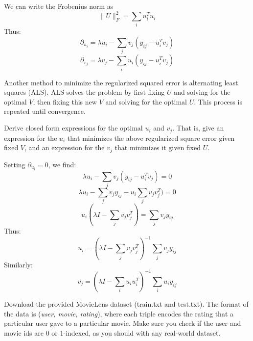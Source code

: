 \begin{solution}
 We can write the Frobenius norm as
 \begin{equation}
	 \|U\|_F^2 = \sum_i u_i^Tu_i
 \end{equation}
 Thus:
 \begin{equation}
	 \partial_{u_i} = \lambda u_i-\sum_j v_j(y_{ij}-u_i^Tv_j)
 \end{equation}
 \begin{equation}
	\partial_{v_j} = \lambda v_j-\sum_i u_i(y_{ij}-u_i^Tv_j)
\end{equation}
\end{solution}

\problem[5]
Another method to minimize the regularized squared error is alternating least squares (ALS). ALS solves the problem by first fixing $U$ and solving for the optimal $V$, then fixing this new $V$ and solving for the optimal $U$.  This process is repeated until convergence.

Derive closed form expressions for the optimal $u_i$ and $v_j$.  That is, give an expression for the $u_i$ that minimizes the above regularized square error given fixed $V$, and an expression for the $v_j$ that minimizes it given fixed $U$.

\begin{solution}
 Setting $\partial_{u_i} = 0$, we find:
 \begin{equation}
	\lambda u_i-\sum_j v_j(y_{ij}-u_i^Tv_j)=0
 \end{equation}
 \begin{equation}
	\lambda u_i-\sum_j v_jy_{ij}-u_i\sum_jv_jv_j^T)=0
 \end{equation}
 \begin{equation}
	u_i(\lambda I-\sum_jv_jv_j^T)=\sum_j v_jy_{ij}
 \end{equation}
 Thus:
 \begin{equation}
	u_i = (\lambda I-\sum_jv_jv_j^T)^{-1}\sum_j v_jy_{ij}
 \end{equation}
 Similarly:
 \begin{equation}
	v_j = (\lambda I-\sum_iu_iu_i^T)^{-1}\sum_i u_iy_{ij}
 \end{equation}
\end{solution}

\problem[10]
Download the provided MovieLens dataset (train.txt and test.txt).  The format of the data is (\emph{user, movie, rating}), where each triple encodes the rating that a particular user gave to a particular movie. Make sure you check if the user and movie ids are 0 or 1-indexed, as you should with any real-world dataset.

